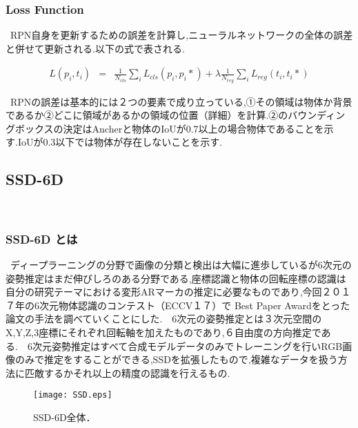 \documentclass[11pt,a4j,ascmac]{jarticle}
\begin{document}
\subsubsection{Loss Function}
\  RPN自身を更新するための誤差を計算し,ニューラルネットワークの全体の誤差と併せて更新される.以下の式で表される.



\begin{eqnarray}
\label{eq:polynomial1}
L({p_i},{t_i}) &=& \frac{1}{N_{cls}} \sum_{i}L_{cls}(p_i,p_i*)+λ\frac{1}{N_{reg}} \sum_{i}L_{reg}(t_i,t_i*)
\end{eqnarray}

\  RPNの誤差は基本的には２つの要素で成り立っている,①その領域は物体か背景であるか②どこに領域があるかの領域の位置（詳細）を計算.②のバウンディングボックスの決定はAncherと物体のIoUが0.7以上の場合物体であることを示す.IoUが0.3以下では物体が存在しないことを示す.\ 



\subsection{SSD-6D}

\ 


\subsubsection{SSD-6D とは}
\  ディープラーニングの分野で画像の分類と検出は大幅に進歩しているが6次元の姿勢推定はまだ伸びしろのある分野である,座標認識と物体の回転座標の認識は自分の研究テーマにおける変形ARマーカの推定に必要なものであり,今回２０１７年の6次元物体認識のコンテスト（ECCV１７）で Best Paper Awardをとった論文の手法を調べていくことにした.\ 
\  6次元の姿勢推定とは３次元空間のX,Y,Z,3座標にそれぞれ回転軸を加えたものであり,６自由度の方向推定である.\ 
\  6次元姿勢推定はすべて合成モデルデータのみでトレーニングを行いRGB画像のみで推定をすることができる,SSDを拡張したもので,複雑なデータを扱う方法に匹敵するかそれ以上の精度の認識を行えるもの.\\

    \begin{figure}[htpp]
     \centering
      \texttt{[image: SSD.eps]}
      \vspace*{30mm}
      \caption{SSD-6D全体．}
      \label{SSD-6D全体}
    \end{figure}
\end{document}
